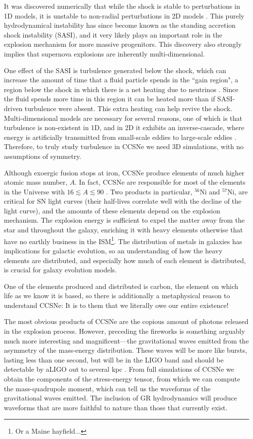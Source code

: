 It was discovered numerically that while the shock is stable to
perturbations in 1D models, it is unstable to non-radial perturbations
in 2D models \citep{bmd2003}.
This purely hydrodynamical instability has since become known as the
standing accretion shock instability (SASI), and it very likely plays an
important role in the explosion mechanism for more massive progenitors.
This discovery also strongly implies that supernova explosions are
inherently multi-dimensional.

One effect of the SASI is turbulence generated below the shock,
which can increase the amount of time that a fluid particle spends
in the ``gain region", a region below the shock in which there is a
net heating due to neutrinos \citep{co2015}.
Since the fluid spends more time in this region it can be heated more than if
SASI-driven turbulence were absent.
This extra heating can help revive the shock.
Multi-dimensional models are necessary for several reasons,
one of which is that turbulence is non-existent in 1D, and in 2D it
exhibits an inverse-cascade, where energy is artificially transmitted
from small-scale eddies to large-scale eddies \citep{yem2017}.
Therefore, to truly study turbulence in CCSNe we need 3D simulations,
with no assumptions of symmetry.

Although exoergic fusion stops at iron,
CCSNe produce elements of much higher atomic mass number, $A$.
In fact, CCSNe are responsible for most of the elements in the Universe with
$16\lesssim A\lesssim90$ \citep{bw2017}.
Two products in particular, $^{56}$Ni and $^{57}$Ni, are critical for SN light
curves (their half-lives correlate well with the decline of the light curve),
and the amounts of these elements depend on the explosion mechanism.
The explosion energy is sufficient to expel the matter away from the star
and throughout the galaxy, enriching it with heavy elements otherwise that have
no earthly business in the ISM\footnote{Or a Maine hayfield...}.
The distribution of metals in galaxies has implications for galactic
evolution, so an understanding of how the heavy elements are distributed,
and especially how much of each element is distributed,
is crucial for galaxy evolution models.

One of the elements produced and distributed is carbon,
the element on which life as we know it is based, so there is additionally
a metaphysical reason to understand CCSNe:
It is to them that we literally owe our entire existence!

The most obvious products of CCSNe are the copious amount of photons
released in the explosion process.
However, preceding the fireworks is something arguably much more interesting
and magnificent---the gravitational waves emitted from the asymmetry of the
mass-energy distribution.
These waves will be more like bursts, lasting less than one second,
but will be in the LIGO band and should be detectable by aLIGO
out to several kpc \citep{aaa2016}.
From full simulations of CCSNe we obtain the components of the stress-energy
tensor, from which we can compute the mass-quadrupole moment,
which can tell us the waveforms of the gravitational waves emitted.
The inclusion of GR hydrodynamics will produce waveforms that are more
faithful to nature than those that currently exist.

